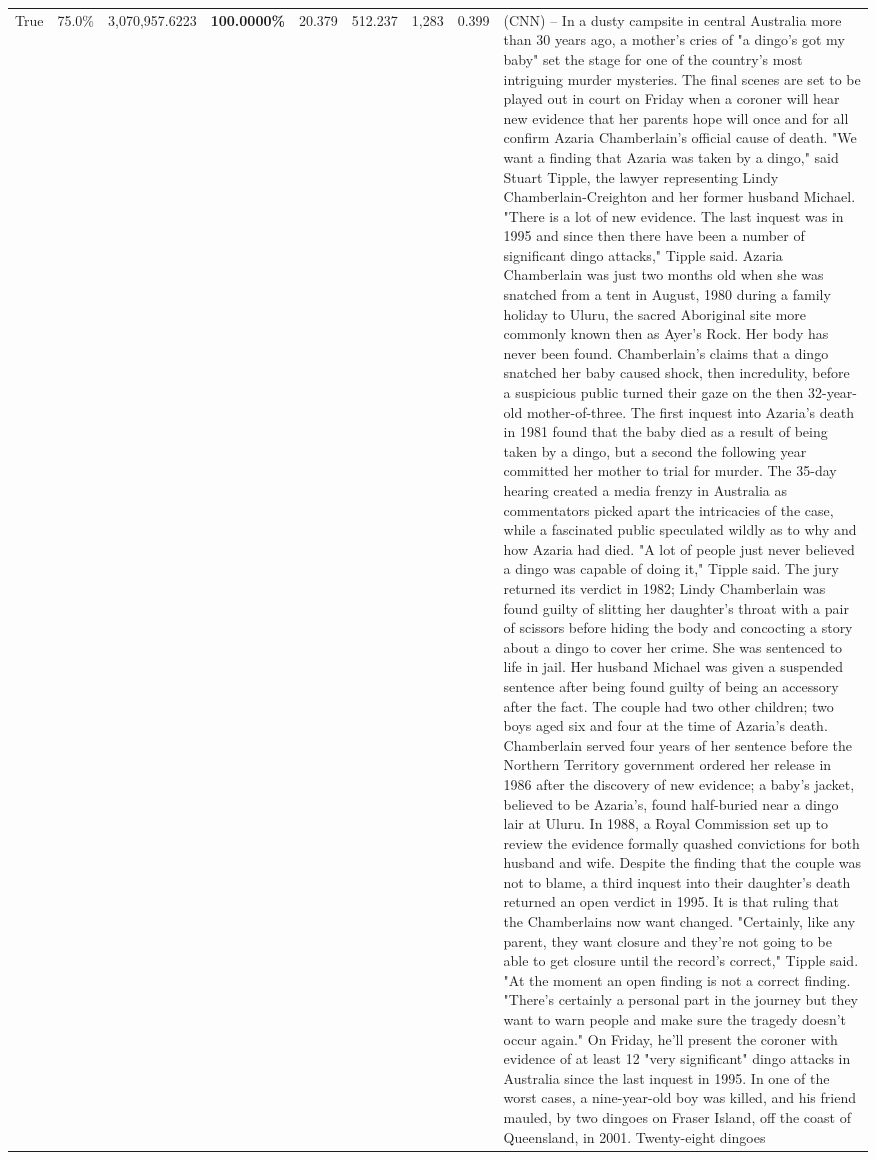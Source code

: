 \begin{table}[H]
\begin{tabular}{lllrlllll}
True & 75.0\% & 3,070,957.6223 & \bfseries \color{red} 100.0000\% & 20.379 & 512.237 & 1,283 & 0.399 & (CNN) -- In a dusty campsite in central Australia more than 30 years ago, a mother's cries of "a dingo's got my baby" set the stage for one of the country's most intriguing murder mysteries. The final scenes are set to be played out in court on Friday when a coroner will hear new evidence that her parents hope will once and for all confirm Azaria Chamberlain's official cause of death. "We want a finding that Azaria was taken by a dingo," said Stuart Tipple, the lawyer representing Lindy Chamberlain-Creighton and her former husband Michael. "There is a lot of new evidence. The last inquest was in 1995 and since then there have been a number of significant dingo attacks," Tipple said. Azaria Chamberlain was just two months old when she was snatched from a tent in August, 1980 during a family holiday to Uluru, the sacred Aboriginal site more commonly known then as Ayer's Rock. Her body has never been found. Chamberlain's claims that a dingo snatched her baby caused shock, then incredulity, before a suspicious public turned their gaze on the then 32-year-old mother-of-three. The first inquest into Azaria's death in 1981 found that the baby died as a result of being taken by a dingo, but a second the following year committed her mother to trial for murder. The 35-day hearing created a media frenzy in Australia as commentators picked apart the intricacies of the case, while a fascinated public speculated wildly as to why and how Azaria had died. "A lot of people just never believed a dingo was capable of doing it," Tipple said. The jury returned its verdict in 1982; Lindy Chamberlain was found guilty of slitting her daughter's throat with a pair of scissors before hiding the body and concocting a story about a dingo to cover her crime. She was sentenced to life in jail. Her husband Michael was given a suspended sentence after being found guilty of being an accessory after the fact. The couple had two other children; two boys aged six and four at the time of Azaria's death. Chamberlain served four years of her sentence before the Northern Territory government ordered her release in 1986 after the discovery of new evidence; a baby's jacket, believed to be Azaria's, found half-buried near a dingo lair at Uluru. In 1988, a Royal Commission set up to review the evidence formally quashed convictions for both husband and wife. Despite the finding that the couple was not to blame, a third inquest into their daughter's death returned an open verdict in 1995. It is that ruling that the Chamberlains now want changed. "Certainly, like any parent, they want closure and they're not going to be able to get closure until the record's correct," Tipple said. "At the moment an open finding is not a correct finding. "There's certainly a personal part in the journey but they want to warn people and make sure the tragedy doesn't occur again." On Friday, he'll present the coroner with evidence of at least 12 "very significant" dingo attacks in Australia since the last inquest in 1995. In one of the worst cases, a nine-year-old boy was killed, and his friend mauled, by two dingoes on Fraser Island, off the coast of Queensland, in 2001. Twenty-eight dingoes 
\end{tabular}
\end{table}
